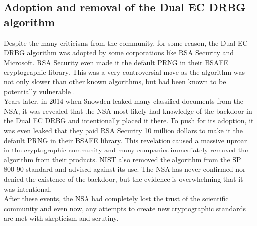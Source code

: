 \subsection{Adoption and removal of the Dual EC DRBG algorithm}

Despite the many criticisms from the community, for some reason, the Dual EC DRBG algorithm was adopted by some corporations like RSA Security and Microsoft. RSA Security even made it the default PRNG in their BSAFE cryptographic library. This was a very controversial move as the algorithm was not only slower than other known algorithms, but had been known to be potentially vulnerable \cite{dual-ec-drbg-backdoor}.
\\

Years later, in 2014 when Snowden leaked many classified documents from the NSA, it was revealed that the NSA most likely had knowledge of the backdoor in the Dual EC DRBG and intentionally placed it there. To push for its adoption, it was even leaked that they paid RSA Security 10 million dollars to make it the default PRNG in their BSAFE library. This revelation caused a massive uproar in the cryptographic community and many companies immediately removed the algorithm from their products. NIST also removed the algorithm from the SP 800-90 standard and advised against its use. The NSA has never confirmed nor denied the existence of the backdoor, but the evidence is overwhelming that it was intentional.
\\

After these events, the NSA had completely lost the trust of the scientific community and even now, any attempts to create new cryptographic standards are met with skepticism and scrutiny.